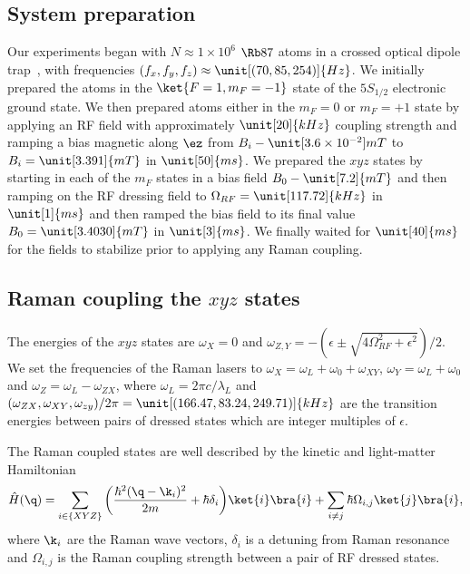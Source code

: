 \subsection{System preparation}
Our experiments began with $N\approx 1\times 10^6$  $\Rb87$ atoms in a crossed optical dipole trap~\cite{lin_rapid_2009}, with frequencies $(f_x,f_y,f_z) \approx \unit[(70, 85, 254)]{Hz}$. We initially prepared the atoms in the $\ket{F=1, m_F=-1}$ state of the $5S_{1/2}$ electronic ground state. We then prepared atoms either in the $m_F=0$ or $m_F=+1$ state by applying an RF field with approximately $\unit[20]{kHz}$ coupling strength and ramping a bias magnetic along $\ez$ from $B_i-\unit[3.6\times 10^{-2}]{mT}$ to $B_i=\unit[3.391]{mT}$ in $\unit[50]{ms}$. We prepared the $xyz$ states by starting in each of the $m_F$ states in a bias field $B_0-\unit[7.2]{mT}$ and then ramping on the RF dressing field to $\Omega_{RF}=\unit[117.72]{kHz}$ in $\unit[1]{ms}$ and then ramped the bias field to its final value $B_0=\unit[3.4030]{mT}$ in $\unit[3]{ms}$. We finally waited for $\unit[40]{ms}$ for the fields to stabilize prior to applying any Raman coupling. 


\subsection{Raman coupling the $xyz$ states}

The energies of the $xyz$ states are $\omega_X=0$ and $\omega_{Z,Y}=-(\epsilon\pm\sqrt{4\Omega_{RF}^2+\epsilon^2})/2$. We set the frequencies of the Raman lasers to $\omega_X=\omega_L+\omega_0+\omega_{XY}$, $\omega_Y=\omega_L+\omega_0$ and $\omega_Z=\omega_L-\omega_{ZX}$,  where $\omega_L=2\pi c/\lambda_L$ and $(\omega_{ZX}, \omega_{XY}, \omega_{zy})/2\pi = \unit[(166.47, 83.24, 249.71)]{kHz}$ are the transition energies between pairs of dressed states which are integer multiples of $\epsilon$.

The Raman coupled states are well described by the kinetic and light-matter Hamiltonian 
\begin{equation}
	\hat H(\q) =\sum_{i\in\{XYZ\}}\bigg(\frac{\hbar^2(\q-\k_i)^2}{2m}+\hbar\delta_i\bigg)\ket{i}\bra{i}+\sum_{i\neq j}\hbar\Omega_{i,j}\ket{j}\bra{i},
	\label{Eq:Rashba_atoms}
\end{equation}
where $\k_i$ are the Raman wave vectors, $\delta_i$ is a detuning from Raman resonance and $\Omega_{i,j}$ is the Raman coupling strength between a pair of RF dressed states. 


